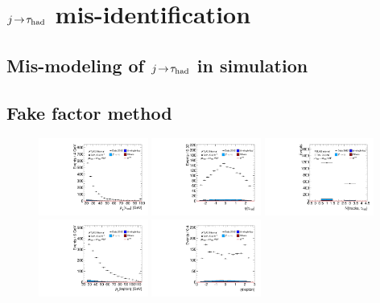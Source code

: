 \clearpage
\section{$j\!\rightarrow\!\tau_\text{had}$ mis-identification}
\label{sec:backgrounds-misid}

\subsection{Mis-modeling of $j\!\rightarrow\!\tau_\text{had}$ in simulation}

\subsection{Fake factor method}

\begin{figure}[tp]
  \centering
  \includegraphics[width=0.32\textwidth]{figures/antitaus/tau-pt}
  \includegraphics[width=0.32\textwidth]{figures/antitaus/tau-eta}
  \includegraphics[width=0.32\textwidth]{figures/antitaus/tau-numTrack}
  \includegraphics[width=0.32\textwidth]{figures/antitaus/lep-pt-hi}
  \includegraphics[width=0.32\textwidth]{figures/antitaus/lep-eta}

\end{figure}
